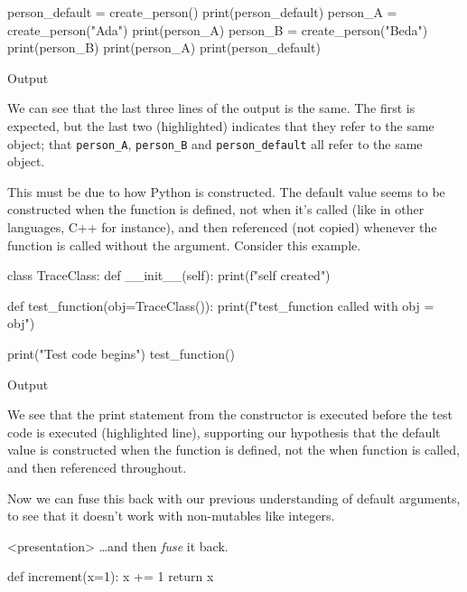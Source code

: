 \begin{description}
\begin{pyblock}[default1][highlightlines={10-12}]
person_default = create_person()
print(person_default)
person_A = create_person("Ada")
print(person_A)
person_B = create_person("Beda")
print(person_B)
print(person_A)
print(person_default)
    \end{pyblock}
    \begin{block}{Output}\printpythontex[verbatim][highlightlines={4-5}]\end{block}

    We can see that the last three lines of the output is the same.
    The first is expected, but the last two (highlighted) indicates that they 
    refer to the same object; \ie that \texttt{person_A}, 
    \texttt{person_B} and \texttt{person_default} all 
    refer to the same object.

    This must be due to how Python is constructed.
    The default value seems to be constructed when the function is defined, not 
    when it's called (like in other languages, C++ for instance), and then 
    referenced (not copied) whenever the function is called without the 
    argument.
    Consider this example.

    \begin{pyblock}[default1][highlightlines=5]
class TraceClass:
  def __init__(self):
    print(f"{self} created")

def test_function(obj=TraceClass()):
  print(f"test_function called with obj = {obj}")

print("Test code begins")
test_function()
    \end{pyblock}
    \begin{block}{Output}\printpythontex[verbatim][highlightlines={1}]\end{block}

    We see that the print statement from the constructor is executed before the 
    test code is executed (highlighted line), supporting our hypothesis that 
    the default value is constructed when the function is defined, not the when 
    function is called, and then referenced throughout.

  \item[Fusion] Now we can fuse this back with our previous understanding of 
    default arguments, to see that it doesn't work with non-mutables like 
    integers.
    \begin{frame}<presentation>
      \dots and then \emph{fuse} it back.
    \end{frame}
    \begin{frame}[fragile]
    \begin{pyblock}[default1]
def increment(x=1):
  x += 1
  return x


\end{pyblock}
\end{frame}
\end{description}
